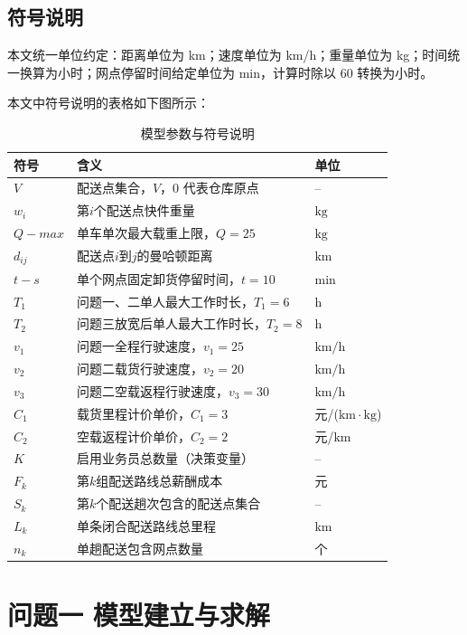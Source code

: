 \documentclass[withoutpreface,bwprint]{cumcmthesis} %
\begin{document}
\subsection{符号说明}
本文统一单位约定：距离单位为 km；速度单位为 km/h；重量单位为 kg；时间统一换算为小时；网点停留时间给定单位为 min，计算时除以 60 转换为小时。
\par 本文中符号说明的表格如下图所示：
\begin{table}[htbp]
\centering
\caption{模型参数与符号说明}
\begin{tabular}{l l l}
\toprule
符号 & 含义 & 单位 \\
\midrule
$V$ & 配送点集合，$V$，$0$ 代表仓库原点 & -- \\
$w_i$ & 第$i$个配送点快件重量 & $\mathrm{kg}$ \\
$Q-max$ & 单车单次最大载重上限，$Q=25$ & $\mathrm{kg}$ \\
$d_{ij}$ & 配送点$i$到$j$的曼哈顿距离 & $\mathrm{km}$ \\
$t-s$ & 单个网点固定卸货停留时间，$t=10$ & $\mathrm{min}$ \\
$T_1$ & 问题一、二单人最大工作时长，$T_1=6$ & $\mathrm{h}$ \\
$T_2$ & 问题三放宽后单人最大工作时长，$T_2=8$ & $\mathrm{h}$ \\
$v_1$ & 问题一全程行驶速度，$v_1=25$ & $\mathrm{km/h}$ \\
$v_2$ & 问题二载货行驶速度，$v_2=20$ & $\mathrm{km/h}$ \\
$v_3$ & 问题二空载返程行驶速度，$v_3=30$ & $\mathrm{km/h}$ \\
$C_1$ & 载货里程计价单价，$C_1=3$ & 元/($\mathrm{km\cdot kg}$) \\
$C_2$ & 空载返程计价单价，$C_2=2$ & 元/$\mathrm{km}$ \\
$K$ & 启用业务员总数量（决策变量） & -- \\
$F_k$ & 第$k$组配送路线总薪酬成本 & 元 \\
$S_k$ & 第$k$个配送趟次包含的配送点集合 & -- \\
$L_k$ & 单条闭合配送路线总里程 & $\mathrm{km}$ \\
$n_k$ & 单趟配送包含网点数量 & 个 \\
\bottomrule
\end{tabular}
\label{tab:para}
\end{table}

\section{问题一 模型建立与求解}
\end{document}
